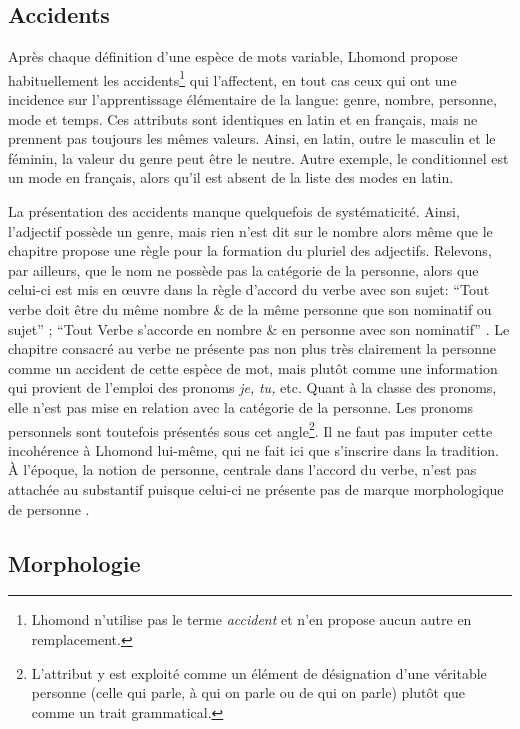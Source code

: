 \documentclass[output=paper]{langsci/langscibook}
\begin{document}
\subsection{Accidents}

Après chaque définition d’une espèce de mots variable, Lhomond propose habituellement les accidents\footnote{ \textrm{Lhomond n’utilise pas le terme} \textrm{\textit{accident}} \textrm{et n’en propose aucun autre en remplacement.}} qui l’affectent, en tout cas ceux qui ont une incidence sur l’apprentissage élémentaire de la langue: genre, nombre, personne, mode et temps. Ces attributs sont identiques en latin et en français, mais ne prennent pas toujours les mêmes valeurs. Ainsi, en latin, outre le masculin et le féminin, la valeur du genre peut être le neutre. Autre exemple, le conditionnel est un mode en français, alors qu’il est absent de la liste des modes en latin.

La présentation des accidents manque quelquefois de systématicité. Ainsi, l’adjectif possède un genre, mais rien n’est dit sur le nombre alors même que le chapitre propose une règle pour la formation du pluriel des adjectifs. Relevons, par ailleurs, que le nom ne possède pas la catégorie de la personne, alors que celui-ci est mis en œuvre dans la règle d’accord du verbe avec son sujet: “Tout verbe doit être du même nombre \& de la même personne que son nominatif ou sujet” \citep[47]{lhomond_elemens_1790}; “Tout Verbe s’accorde en nombre \& en personne avec son nominatif” \citep[31]{lhomond_elemens_1781}. Le chapitre consacré au verbe ne présente pas non plus très clairement la personne comme un accident de cette espèce de mot, mais plutôt comme une information qui provient de l’emploi des pronoms \textit{je,} \textit{tu,} etc. Quant à la classe des pronoms, elle n’est pas mise en relation avec la catégorie de la personne. Les pronoms personnels sont toutefois présentés sous cet angle\footnote{ \textrm{L’attribut y est exploité comme un élément de désignation d’une véritable personne (celle qui parle, à qui on parle ou de qui on parle) plutôt que comme un trait grammatical.}}. Il ne faut pas imputer cette incohérence à Lhomond lui-même, qui ne fait ici que s’inscrire dans la tradition. À l’époque, la notion de personne, centrale dans l’accord du verbe, n’est pas attachée au substantif puisque celui-ci ne présente pas de marque morphologique de personne \citep{colombat_grammaire_1999}.

\subsection{Morphologie}
\end{document}
